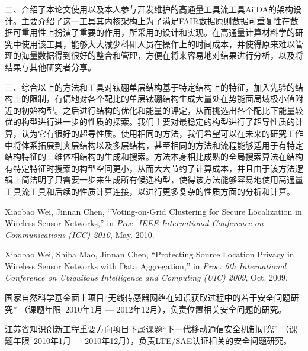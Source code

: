 \documentclass[phd,nobackinfo]{scutthesis}
\begin{document}
二、介绍了本论文使用以及本人参与开发维护的高通量工具流工具AiiDA的架构设计。主要介绍了这一工具其内核架构上为了满足FAIR数据原则数据可重复性在数据可重用性上扮演了重要的作用，所采用的设计和实现。在高通量计算材料学的研究中使用该工具，能够大大减少科研人员在操作上的时间成本，并使得原来难以管理的海量数据得到很好的整合和管理，方便在将来容易地对结果进行分析，以及将结果与其他研究者分享。

三、综合以上的方法和工具对钛硼单层结构基于特定结构上的特征，加入先验的结构上的限制，有偏地对各个配比的单层钛硼结构生成大量处在势能面局域极小值附近的初始构型。之后进行结构的优化和能量的评定，从而挑选出各个配比下能量较优的构型进行进一步的性质的探索。我们主要对最稳定的构型进行了超导性质的计算，认为它有很好的超导性质。使用相同的方法，我们希望可以在未来的研究工作中将体系拓展到夹层结构以及多层结构，甚至相同的方法和流程能够适用于有特定结构特征的三维体相结构的生成和搜索。方法本身相比成熟的全局搜索算法在结构有特定特征时搜索的构型空间更小，从而大大节约了计算成本，并且由于该方法逻辑上简洁明了只需要一步来生成所有候选构型，使得该方法能够容易地使用高通量工具流工具和后续的性质计算连接，以进行更多复杂的性质方面的分析和计算。


\begin{resume}

\begin{publications}
\item Xiaobao Wei, Jinnan Chen, ``Voting-on-Grid Clustering for Secure
  Localization in Wireless Sensor Networks,'' in \textsl{Proc. IEEE International
    Conference on Communications (ICC) 2010}, May. 2010.
\item Xiaobao Wei, Shiba Mao, Jinnan Chen, ``Protecting Source Location Privacy
  in Wireless Sensor Networks with Data Aggregation,'' in \textsl{Proc. 6th
    International Conference on Ubiquitous Intelligence and Computing (UIC)
    2009}, Oct. 2009.
\end{publications}
\begin{projects}
\item 国家自然科学基金面上项目``无线传感器网络在知识获取过程中的若干安全问题研究''
（课题年限~2010年1月 --- 2012年12月），负责位置相关安全问题的研究。
\item 江苏省知识创新工程重要方向项目下属课题``下一代移动通信安全机制研究''
（课题年限~2010年1月 --- 2010年12月），负责LTE/SAE认证相关的安全问题研究。
\end{projects}
\end{resume}
\end{document}
